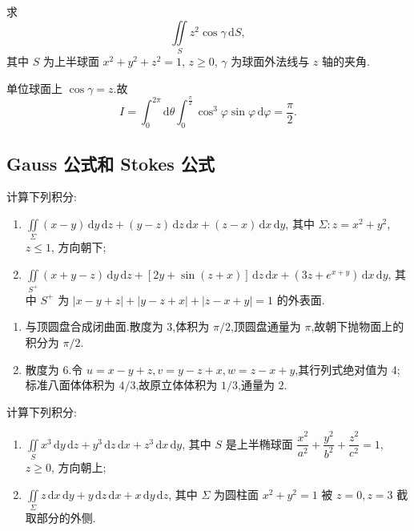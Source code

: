 \begin{example}
    求
    \[
        \displaystyle\iint\limits_Sz^2\cos\gamma\,\mathrm{d}S,
    \]
    其中 $S$ 为上半球面 $x^2+y^2+z^2=1$, $z\geq0$, $\gamma$ 为球面外法线与 $z$ 轴的夹角.
\end{example}
\exampleblank

\begin{solution}
    单位球面上 $\cos\gamma=z$.故
    \[
        I=\int_0^{2\pi}\!\mathrm{d}\theta\int_0^{\frac{\pi}{2}}\cos^3\varphi\sin\varphi\,\mathrm{d}\varphi=\dfrac{\pi}{2}.
    \]
\end{solution}



\subsection{Gauss 公式和 Stokes 公式}

\begin{example}
    计算下列积分:
    \begin{enumerate}
        \item $\displaystyle\iint\limits_\Sigma(x-y)\,\mathrm{d}y\,\mathrm{d}z+(y-z)\,\mathrm{d}z\,\mathrm{d}x+(z-x)\,\mathrm{d}x\,\mathrm{d}y$, 其中 $\Sigma:z=x^2+y^2$, $z\leq1$, 方向朝下;
        \item $\displaystyle\iint\limits_{S^+}(x+y-z)\,\mathrm{d}y\,\mathrm{d}z+[2y+\sin(z+x)]\,\mathrm{d}z\,\mathrm{d}x+(3z+e^{x+y})\,\mathrm{d}x\,\mathrm{d}y$, 其中 $S^+$ 为 $|x-y+z|+|y-z+x|+|z-x+y|=1$ 的外表面.
    \end{enumerate}
\end{example}
\exampleblank

\begin{solution}
    \leavevmode
    \begin{enumerate}
        \item 与顶圆盘合成闭曲面.散度为 $3$,体积为 $\pi/2$,顶圆盘通量为 $\pi$,故朝下抛物面上的积分为 $\pi/2$.
        \item 散度为 $6$.令
              $u=x-y+z,v=y-z+x,w=z-x+y$,其行列式绝对值为 $4$;标准八面体体积为 $4/3$,故原立体体积为 $1/3$,通量为 $2$.
    \end{enumerate}
\end{solution}

\begin{example}
    计算下列积分:
    \begin{enumerate}
        \item $\displaystyle\iint\limits_Sx^3\,\mathrm{d}y\,\mathrm{d}z+y^3\,\mathrm{d}z\,\mathrm{d}x+z^3\,\mathrm{d}x\,\mathrm{d}y$, 其中 $S$ 是上半椭球面 $\dfrac{x^2}{a^2}+\dfrac{y^2}{b^2}+\dfrac{z^2}{c^2}=1$, $z\geq0$, 方向朝上;
        \item $\displaystyle\iint\limits_\Sigma z\,\mathrm{d}x\,\mathrm{d}y+y\,\mathrm{d}z\,\mathrm{d}x+x\,\mathrm{d}y\,\mathrm{d}z$, 其中 $\Sigma$ 为圆柱面 $x^2+y^2=1$ 被 $z=0,z=3$ 截取部分的外侧.
    \end{enumerate}
\end{example}
\exampleblank

